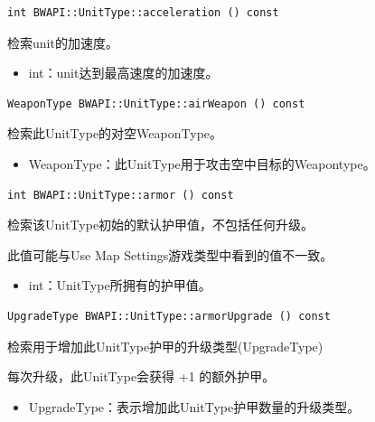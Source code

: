 \begin{tcolorbox}[colback=white, colframe=black!60!white, title=acceleration(), arc=0mm]
    \begin{verbatim}
int BWAPI::UnitType::acceleration () const
    \end{verbatim}
检索unit的加速度。
\begin{return}
\begin{itemize}
    \item int：unit达到最高速度的加速度。
\end{itemize}
\end{return}
\end{tcolorbox}

\begin{tcolorbox}[colback=white, colframe=black!60!white, title=airWeapon(), arc=0mm]
    \begin{verbatim}
WeaponType BWAPI::UnitType::airWeapon () const
    \end{verbatim}
检索此UnitType的对空WeaponType。
\begin{return}
\begin{itemize}
    \item WeaponType：此UnitType用于攻击空中目标的Weapontype。
\end{itemize}
\end{return}
\end{tcolorbox}


\begin{tcolorbox}[colback=white, colframe=black!60!white, title=armor(), arc=0mm]
    \begin{verbatim}
int BWAPI::UnitType::armor () const
    \end{verbatim}
检索该UnitType初始的默认护甲值，不包括任何升级。
\begin{note}
此值可能与Use Map Settings游戏类型中看到的值不一致。
\end{note}
\begin{return}
\begin{itemize}
    \item int：UnitType所拥有的护甲值。
\end{itemize}
\end{return}
\end{tcolorbox}


\begin{tcolorbox}[colback=white, colframe=black!60!white, title=armorUpgrade(), arc=0mm]
    \begin{verbatim}
UpgradeType BWAPI::UnitType::armorUpgrade () const
    \end{verbatim}
检索用于增加此UnitType护甲的升级类型(UpgradeType)\par
每次升级，此UnitType会获得 +1 的额外护甲。
\begin{return}
\begin{itemize}
    \item UpgradeType：表示增加此UnitType护甲数量的升级类型。
\end{itemize}
\end{return}
\end{tcolorbox}


